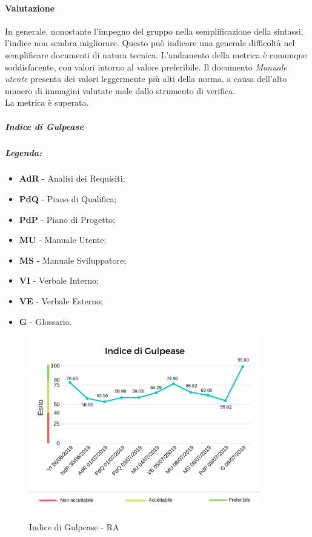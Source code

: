 	\paragraph*{Valutazione} In generale, nonostante l'impegno del gruppo nella semplificazione della sintassi, l'indice non sembra migliorare. Questo può  indicare una generale difficoltà nel semplificare documenti di natura tecnica. L'andamento della metrica è comunque soddisfacente, con valori intorno al valore preferibile. 
	Il documento \textit{Manuale utente} presenta dei valori leggermente più alti della norma, a causa dell'alto numero di immagini valutate male dallo strumento di verifica. 
	 \\
	La metrica è superata.
	\pagebreak
	\subparagraph{Indice di Gulpease} 
	\subparagraph*{Legenda:}
\begin{itemize}
	\item \textbf{AdR} - Analisi dei Requisiti;
	\item \textbf{PdQ} - Piano di Qualifica;
	\item \textbf{PdP} - Piano di Progetto;
	\item \textbf{MU} - Manuale Utente;
	\item \textbf{MS} - Manuale Sviluppatore;
	\item \textbf{VI} - Verbale Interno;
	\item \textbf{VE} - Verbale Esterno;
	\item \textbf{G} - Glossario.
\end{itemize}
	\begin{center}
		\begin{figure}[h] 
			\centering 
			\includegraphics[width=0.90\textwidth]{res/images/new/gulpease.png}\\
			\caption{Indice di Gulpease - RA}
		\end{figure}
	\end{center}

